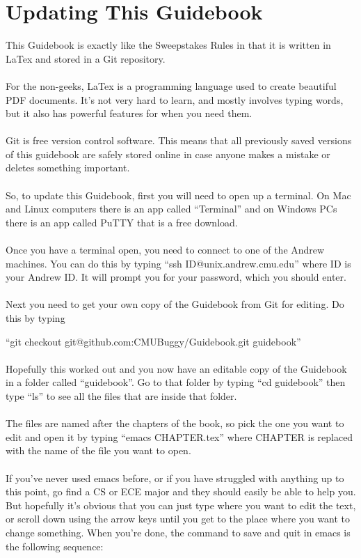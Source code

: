 \section{Updating This Guidebook}
\label{sec:Updating}
This Guidebook is exactly like the Sweepstakes Rules in that it is written in
LaTex and stored in a Git repository.
\\\\
For the non-geeks, LaTex is a programming language used to create beautiful
PDF documents. It's not very hard to learn, and mostly involves typing words,
but it also has powerful features for when you need them.
\\\\
Git is free version control software. This means that all previously saved
versions of this guidebook are safely stored online in case anyone makes a
mistake or deletes something important.
\\\\
So, to update this Guidebook, first you will need to open up a terminal.
On Mac and Linux computers there is an app called ``Terminal'' and on Windows
PCs there is an app called PuTTY that is a free download.
\\\\
Once you have a terminal open, you need to connect to one of the Andrew
machines. You can do this by typing ``ssh ID@unix.andrew.cmu.edu''
where ID is your Andrew ID. It will prompt you for your password,
which you should enter.
\\\\
Next you need to get your own copy of the Guidebook from Git for editing.
Do this by typing

``git checkout git@github.com:CMUBuggy/Guidebook.git guidebook''
\\\\
Hopefully this worked out and you now have an editable copy of the Guidebook
in a folder called ``guidebook''. Go to that folder by typing ``cd guidebook''
then type ``ls'' to see all the files that are inside that folder.
\\\\
The files are named after the chapters of the book, so pick the one you
want to edit and open it by typing ``emacs CHAPTER.tex'' where CHAPTER is
replaced with the name of the file you want to open.
\\\\
If you've never used emacs before, or if you have struggled with anything up
to this point, go find a CS or ECE major and they should easily be able to
help you. But hopefully it's obvious that you can just type where you want to
edit the text, or scroll down using the arrow keys until you get to the place
where you want to change something. When you're done, the command to save and
quit in emacs is the following sequence:

